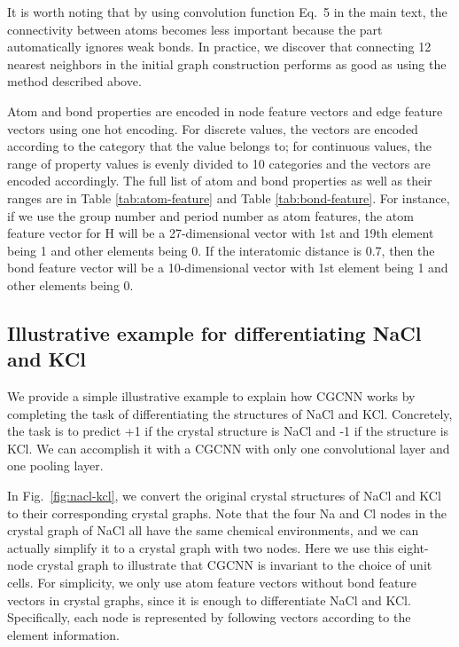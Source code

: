 \documentclass[twocolumn, prl]{revtex4-1}
\begin{document}
It is worth noting that by using convolution function Eq.~5 in the main text, the connectivity between atoms becomes less important because the  part automatically ignores weak bonds. In practice, we discover that connecting 12 nearest neighbors in the initial graph construction performs as good as using the method described above.

 Atom and bond properties are encoded in node feature vectors  and edge feature vectors  using one hot encoding. For discrete values, the vectors are encoded according to the category that the value belongs to; for continuous values, the range of property values is evenly divided to 10 categories and the vectors are encoded accordingly. The full list of atom and bond properties as well as their ranges are in Table \ref{tab:atom-feature} and Table \ref{tab:bond-feature}. For instance, if we use the group number and period number as atom features, the atom feature vector for H will be a 27-dimensional vector with 1st and 19th element being 1 and other elements being 0. If the interatomic distance is 0.7, then the bond feature vector will be a 10-dimensional vector with 1st element being 1 and other elements being 0.

\subsection{Illustrative example for differentiating NaCl and KCl}

We provide a simple illustrative example to explain how CGCNN works by completing the task of differentiating the structures of NaCl and KCl. Concretely, the task is to predict +1 if the crystal structure is NaCl and -1 if the structure is KCl. We can accomplish it with a CGCNN with only one convolutional layer and one pooling layer.

In Fig.~\ref{fig:nacl-kcl}, we convert the original crystal structures of NaCl and KCl to their corresponding crystal graphs. Note that the four Na and Cl nodes in the crystal graph of NaCl all have the same chemical environments, and we can actually simplify it to a crystal graph with two nodes. Here we use this eight-node crystal graph to illustrate that CGCNN is invariant to the choice of unit cells. For simplicity, we only use atom feature vectors without bond feature vectors in crystal graphs, since it is enough to differentiate NaCl and KCl. Specifically, each node is represented by following vectors according to the element information.
\end{document}
